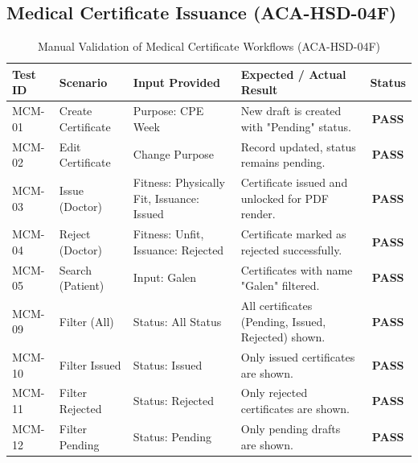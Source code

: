 \subsection{Medical Certificate Issuance (ACA-HSD-04F)}
\begin{table}[H]
\centering
\caption{Manual Validation of Medical Certificate Workflows (ACA-HSD-04F)}
\begin{tabularx}{\textwidth}{|l|Y|Y|Y|c|}
\hline
\textbf{Test ID} & \textbf{Scenario} & \textbf{Input Provided} & \textbf{Expected / Actual Result} & \textbf{Status} \\
\hline
MCM-01 & Create Certificate & Purpose: CPE Week & New draft is created with "Pending" status. & \textbf{PASS} \\
\hline
MCM-02 & Edit Certificate & Change Purpose & Record updated, status remains pending. & \textbf{PASS} \\
\hline
MCM-03 & Issue (Doctor) & Fitness: Physically Fit, Issuance: Issued & Certificate issued and unlocked for PDF render. & \textbf{PASS} \\
\hline
MCM-04 & Reject (Doctor) & Fitness: Unfit, Issuance: Rejected & Certificate marked as rejected successfully. & \textbf{PASS} \\
\hline
MCM-05 & Search (Patient) & Input: Galen & Certificates with name "Galen" filtered. & \textbf{PASS} \\
\hline
MCM-09 & Filter (All) & Status: All Status & All certificates (Pending, Issued, Rejected) shown. & \textbf{PASS} \\
\hline
MCM-10 & Filter Issued & Status: Issued & Only issued certificates are shown. & \textbf{PASS} \\
\hline
MCM-11 & Filter Rejected & Status: Rejected & Only rejected certificates are shown. & \textbf{PASS} \\
\hline
MCM-12 & Filter Pending & Status: Pending & Only pending drafts are shown. & \textbf{PASS} \\
\hline
\end{tabularx}
\end{table}

